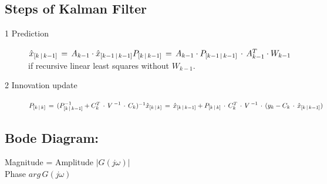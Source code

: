\subsection*{Steps of Kalman Filter}
\begin{description}
\item[1 Prediction] $\hat { x } _{ [k\, |\, k-1] }\, =\, A_{ k-1 }\cdot \hat { x } _{ [k-1\, |\, k-1] }\\ P_{ [k\, |\, k-1] }\, =\, A_{ k-1 }\cdot { P }_{ [k-1\, |\, k-1] }\, \cdot \, A_{ k-1 }^{ T }\cdot { W }_{ k-1 }$ \\
if recursive linear least squares without \( { W }_{ k-1 } \).
\item[2 Innovation update] $P_{ [k\, |\, k] }\, =\, (P_{ [k\, |\, k-1] }^{ -1 }+C_{ k }^{ T }\, \cdot \, { V\,  }^{ -1 }\, \cdot \, C_{ k })^{ -1 }\\ \hat { x } _{ [k\, |\, k] }\, =\, \hat { x } _{ [k\, |\, k-1] }+P_{ [k\, |\, k] }\, \cdot \, C_{ k }^{ T }\, \cdot \, { V\,  }^{ -1 }\, \cdot \, (y_{ k }-C_{ k }\, \cdot \, \hat { x } _{ [k\, |\, k-1] })$
\end{description}

\subsection*{Bode Diagram:}
Magnitude = Amplitude $|G(j\omega)|$\\
Phase $arg \, G(j\omega)$






